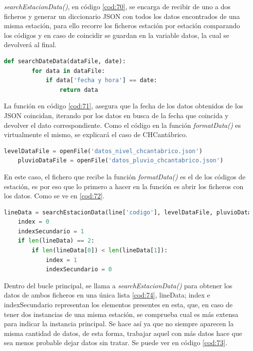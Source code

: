 \textit{searchEstacionData()}, en código \ref{cod:70}, se encarga de recibir de uno a dos ficheros y generar un diccionario JSON con todos los datos encontrados de una misma estación, para ello recorre los ficheros estación por estación comparando los códigos y en caso de coincidir se guardan en la variable datos, la cual se devolverá al final.

\begin{lstlisting}[language=Python, caption={Declaración función \textit{searchDateData()}}, label=cod:71]
	def searchDateData(dataFile, date):
		for data in dataFile:
			if data['fecha y hora'] == date:
				return data
\end{lstlisting}

La función en código \ref{cod:71}, asegura que la fecha de los datos obtenidos de los JSON coincidan, iterando por los datos en busca de la fecha que coincida y devolver el dato correspondiente. \newline
\newline
Como el código en la función \textit{formatData()} es virtualmente el mismo, se explicará el caso de CHCantábrico.

\begin{lstlisting}[language=Python, caption={Lectura de los ficheros de datos de CHCantábrico}, label=cod:72]
	levelDataFile = openFile('datos_nivel_chcantabrico.json')
	pluvioDataFile = openFile('datos_pluvio_chcantabrico.json')
\end{lstlisting}

En este caso, el fichero que recibe la función \textit{formatData()} es el de los códigos de estación, es por eso que lo primero a hacer en la función es abrir los ficheros con los datos. Como se ve en \ref{cod:72}.

\begin{lstlisting}[language=Python, caption={Dentro del bucle que itera por estaciones, obtención de los datos de la estacion y declaración de indices}, label=cod:73]
	lineData = searchEstacionData(line['codigo'], levelDataFile, pluvioDataFile)
	index = 0
	indexSecundario = 1
	if len(lineData) == 2:
		if len(lineData[0]) < len(lineData[1]):
			index = 1
			indexSecundario = 0
\end{lstlisting}

Dentro del bucle principal, se llama a \textit{searchEstacionData()} para obtener los datos de ambos ficheros en una única lista \ref{cod:74}, lineData; index e indexSecundario representan los elementos presentes en esta, que, en caso de tener dos instancias de una misma estación, se comprueba cual es más extensa para indicar la instancia principal. Se hace así ya que no siempre aparecen la misma cantidad de datos, de esta forma, trabajar aquel con más datos hace que sea menos probable dejar datos sin tratar. Se puede ver en código \ref{cod:73}.

